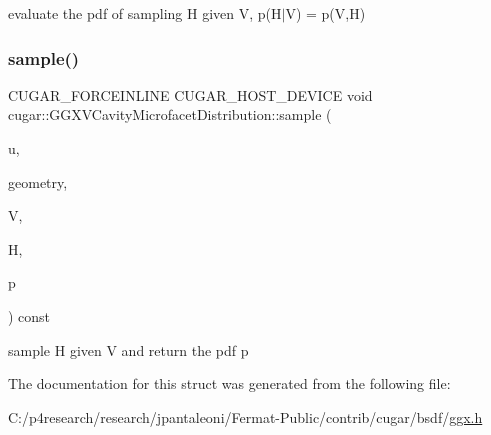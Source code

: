 evaluate the pdf of sampling H given V, p(H$\vert$V) = p(\+V,\+H) \mbox{\label{structcugar_1_1_g_g_x_v_cavity_microfacet_distribution_a2e4cf51c893c14ecb072d8266f942880}} 
\subsubsection{\texorpdfstring{sample()}{sample()}}
{\footnotesize\ttfamily C\+U\+G\+A\+R\+\_\+\+F\+O\+R\+C\+E\+I\+N\+L\+I\+NE C\+U\+G\+A\+R\+\_\+\+H\+O\+S\+T\+\_\+\+D\+E\+V\+I\+CE void cugar\+::\+G\+G\+X\+V\+Cavity\+Microfacet\+Distribution\+::sample (\begin{DoxyParamCaption}\item[{const \hyperlink{structcugar_1_1_vector}{Vector3f}}]{u,  }\item[{const \hyperlink{structcugar_1_1_differential_geometry}{Differential\+Geometry} \&}]{geometry,  }\item[{const \hyperlink{structcugar_1_1_vector}{Vector3f}}]{V,  }\item[{\hyperlink{structcugar_1_1_vector}{Vector3f} \&}]{H,  }\item[{float \&}]{p }\end{DoxyParamCaption}) const\hspace{0.3cm}{\ttfamily [inline]}}

sample H given V and return the pdf p 

The documentation for this struct was generated from the following file\+:\begin{DoxyCompactItemize}
\item 
C\+:/p4research/research/jpantaleoni/\+Fermat-\/\+Public/contrib/cugar/bsdf/\hyperlink{ggx_8h}{ggx.\+h}\end{DoxyCompactItemize}

